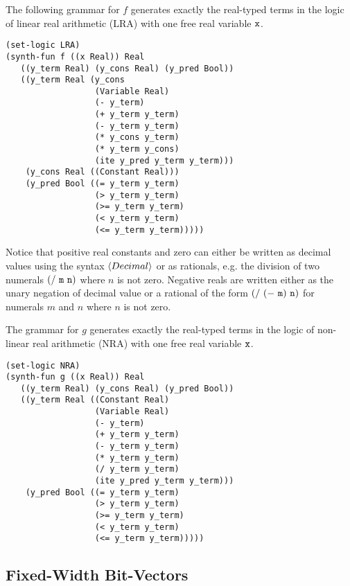 \documentclass[english,a4paper,10pt]{article}
\begin{document}
\begin{appendix}
The following grammar for $f$
generates exactly the real-typed terms in the logic of
linear real arithmetic (LRA)
with one free real variable ${\tt x}$.
\begin{lstlisting}[basicstyle={\ttfamily}]
(set-logic LRA)
(synth-fun f ((x Real)) Real
   ((y_term Real) (y_cons Real) (y_pred Bool))
   ((y_term Real (y_cons 
                  (Variable Real) 
                  (- y_term)
                  (+ y_term y_term)
                  (- y_term y_term)
                  (* y_cons y_term)
                  (* y_term y_cons)
                  (ite y_pred y_term y_term)))
    (y_cons Real ((Constant Real)))
    (y_pred Bool ((= y_term y_term)
                  (> y_term y_term)
                  (>= y_term y_term)
                  (< y_term y_term)
                  (<= y_term y_term)))))
\end{lstlisting}
Notice that positive real constants and zero can either be written 
as decimal values using the syntax $\left\langle Decimal\right\rangle$
or as rationals, e.g. the division of two numerals
${\tt (/\ m\ n)}$ where $n$ is not zero.
Negative reals are written either as the unary negation of decimal value 
or a rational of the form ${\tt (/\ (-\ m)\ n)}$ for numerals $m$ and $n$
where $n$ is not zero.

The grammar for $g$
generates exactly the real-typed terms in the logic of
non-linear real arithmetic (NRA)
with one free real variable ${\tt x}$.
\begin{lstlisting}[basicstyle={\ttfamily}]
(set-logic NRA)
(synth-fun g ((x Real)) Real
   ((y_term Real) (y_cons Real) (y_pred Bool))
   ((y_term Real ((Constant Real) 
                  (Variable Real)
                  (- y_term)
                  (+ y_term y_term)
                  (- y_term y_term)
                  (* y_term y_term)
                  (/ y_term y_term)
                  (ite y_pred y_term y_term)))
    (y_pred Bool ((= y_term y_term)
                  (> y_term y_term)
                  (>= y_term y_term)
                  (< y_term y_term)
                  (<= y_term y_term)))))
\end{lstlisting}

\subsection{Fixed-Width Bit-Vectors}


\end{appendix}
\end{document}

